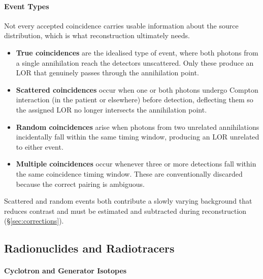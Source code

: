 \paragraph{Event Types}
Not every accepted coincidence carries usable information about the source distribution, which is what reconstruction ultimately needs.

\begin{itemize}
	\item \textbf{True coincidences} are the idealised type of event, where both photons from a single annihilation reach the detectors unscattered. Only these produce an LOR that genuinely passes through the annihilation point.
	\item \textbf{Scattered coincidences} occur when one or both photons undergo Compton interaction (in the patient or elsewhere) before detection, deflecting them so the assigned LOR no longer intersects the annihilation point.
	\item \textbf{Random coincidences} arise when photons from two unrelated annihilations incidentally fall within the same timing window, producing an LOR unrelated to either event.
	\item \textbf{Multiple coincidences} occur whenever three or more detections fall within the same coincidence timing window. These are conventionally discarded because the correct pairing is ambiguous.
\end{itemize}
Scattered and random events both contribute a slowly varying background that reduces contrast and must be estimated and subtracted during reconstruction (\S\ref{sec:corrections}).

\subsection{Radionuclides and Radiotracers}
\label{sec:radiotracers}

\paragraph{Cyclotron and Generator Isotopes}

